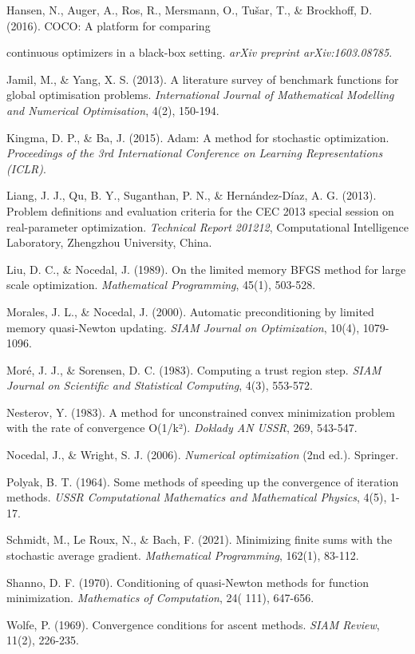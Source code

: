 Hansen, N., Auger, A., Ros, R., Mersmann, O., Tušar, T., \& Brockhoff, D. (2016). COCO: A platform for comparing

continuous optimizers in a black-box setting. \emph{arXiv preprint arXiv:1603.08785}.

Jamil, M., \& Yang, X. S. (2013). A literature survey of benchmark functions for global optimisation problems.
\emph{International Journal of Mathematical Modelling and Numerical Optimisation}, 4(2),
150-194.

Kingma, D. P., \& Ba, J. (2015). Adam: A method for stochastic optimization. \emph{Proceedings of the 3rd International
Conference on Learning Representations (ICLR)}.

Liang, J. J., Qu, B. Y., Suganthan, P. N., \& Hernández-Díaz, A. G. (2013). Problem definitions and evaluation criteria
for the CEC 2013 special session on real-parameter optimization. \emph{Technical Report 201212}, Computational Intelligence
Laboratory, Zhengzhou University, China.

Liu, D. C., \& Nocedal, J. (1989). On the limited memory BFGS method for large scale optimization. \emph{Mathematical
Programming}, 45(1), 503-528.

Morales, J. L., \& Nocedal, J. (2000). Automatic preconditioning by limited memory quasi-Newton updating. \emph{SIAM Journal
on Optimization}, 10(4), 1079-1096.

Moré, J. J., \& Sorensen, D. C. (1983). Computing a trust region step. \emph{SIAM Journal on Scientific and Statistical
Computing}, 4(3), 553-572.

Nesterov, Y. (1983). A method for unconstrained convex minimization problem with the rate of convergence O(1/k²).
\emph{Doklady AN USSR}, 269, 543-547.

Nocedal, J., \& Wright, S. J. (2006). \emph{Numerical optimization} (2nd ed.).
Springer.

Polyak, B. T. (1964). Some methods of speeding up the convergence of iteration methods. \emph{USSR Computational Mathematics
and Mathematical Physics}, 4(5), 1-17.

Schmidt, M., Le Roux, N., \& Bach, F. (2021). Minimizing finite sums with the stochastic average gradient. \emph{Mathematical
Programming}, 162(1), 83-112.

Shanno, D. F. (1970). Conditioning of quasi-Newton methods for function minimization. \emph{Mathematics of Computation}, 24(
111), 647-656.

Wolfe, P. (1969). Convergence conditions for ascent methods. \emph{SIAM Review}, 11(2),
226-235.

